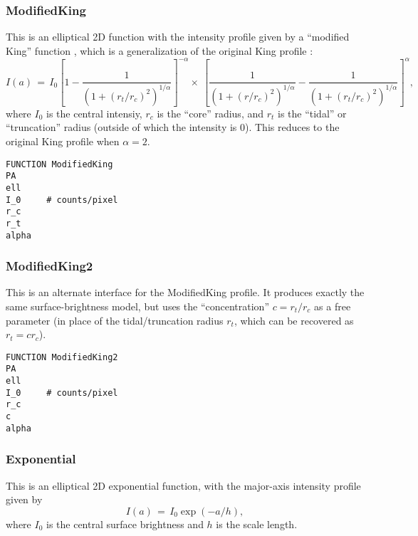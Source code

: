 \documentclass[10pt,a4paper,article]{memoir}
\begin{document}
\subsubsection{ModifiedKing}

This is an elliptical 2D function with the intensity profile given by a 
``modified King'' function \citep{elson99,peng10}, which is a generalization
of the original King profile \citep{king62}:
\begin{equation}
I(a) \, = \, I_{0} \left[1 - \frac{1}{(1 + (r_{t}/r_{c})^{2})^{1/\alpha}} \right]^{-\alpha}
  \times \: \left[ \frac{1}{(1 + (r/r_{c})^{2})^{1/\alpha}} - 
  \frac{1}{(1 + (r_{t}/r_{c})^{2})^{1/\alpha}} \right]^{\alpha},
\end{equation}
where $I_{0}$ is the central intensiy, $r_{c}$ is the ``core'' radius,
and $r_{t}$ is the ``tidal'' or ``truncation'' radius (outside of which
the intensity is 0).
This reduces to the original King profile when $\alpha = 2$.

\begin{verbatim}
FUNCTION ModifiedKing
PA
ell
I_0     # counts/pixel
r_c
r_t
alpha
\end{verbatim}


\subsubsection{ModifiedKing2}

This is an alternate interface for the ModifiedKing profile. It produces
exactly the same surface-brightness model, but uses the
``concentration'' $c = r_t/r_c$ as a free parameter (in place of the
tidal/truncation radius $r_{t}$, which can be recovered as $r_{t} = c r_{c}$).

\begin{verbatim}
FUNCTION ModifiedKing2
PA
ell
I_0     # counts/pixel
r_c
c
alpha
\end{verbatim}




\subsubsection{Exponential}

This is an elliptical 2D exponential function, with the major-axis intensity
profile given by
\begin{equation}
I(a) \, = \, I_{0} \exp(-a/h),
\end{equation}
where $I_{0}$ is the central surface brightness and $h$ is the scale length.
\end{document}
